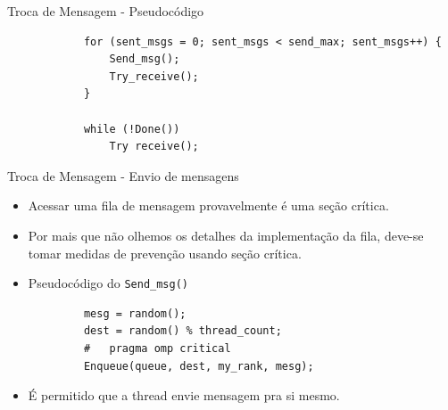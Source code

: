 	\begin{frame}[fragile]{Troca de Mensagem -  Pseudocódigo}
		\begin{verbatim}
			for (sent_msgs = 0; sent_msgs < send_max; sent_msgs++) { 
				Send_msg();
				Try_receive();
			}
			
			while (!Done()) 
				Try receive();
		\end{verbatim}
\end{frame}

	\begin{frame}[fragile]{Troca de Mensagem -  Envio de mensagens}
		\begin{itemize}
			\item Acessar uma fila de mensagem provavelmente é uma seção crítica.
			\item Por mais que não olhemos os detalhes da implementação da fila, deve-se tomar medidas de prevenção usando seção crítica.
			\item Pseudocódigo do {\tt Send\_msg()}
		\end{itemize}
		\begin{verbatim}
			mesg = random();
			dest = random() % thread_count;
			#	pragma omp critical
			Enqueue(queue, dest, my_rank, mesg);
		\end{verbatim}
		\begin{itemize}
			\item É permitido que a thread envie mensagem pra si mesmo.
		\end{itemize}
\end{frame}
